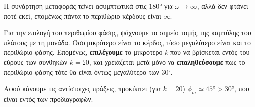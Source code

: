 \documentclass[11pt,a4paper,notitlepage,fleqn,final]{article}
\begin{document}
\begin{exercise}

Η συνάρτηση μεταφοράς τείνει ασυμπτωτικά στις \( \ang{180} \) για \( \omega \to \infty \), αλλά δεν φτάνει ποτέ εκεί, επομένως πάντα το περιθώριο κέρδους είναι \( \infty \).

Για την επιλογή του περιθωρίου φάσης, ψάχνουμε το σημείο τομής της καμπύλης του πλάτους
με τη μονάδα. Όσο μικρότερο είναι το κέρδος, τόσο μεγαλύτερο είναι και το περιθώριο
φάσης. Επομένως, \textbf{επιλέγουμε} το μικρότερο \( k \) που να βρίσκεται εντός
του εύρους των συνθηκών \( k=20 \), και χρειάζεται μετά μόνο να \textbf{επαληθεύσουμε} πως το περιθώριο
φάσης τότε θα είναι όντως μεγαλύτερο των \( \ang{30} \).

Αφού κάνουμε τις αντίστοιχες πράξεις, προκύπτει (για \( k=20 \)) \( \phi_m \simeq \ang{45} > \ang{30}\),
που είναι εντός των προδιαγραφών.

\end{exercise}
\end{document}
